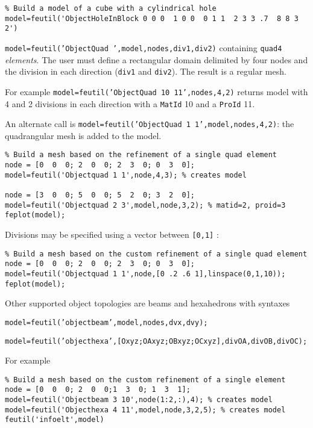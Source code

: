 \begin{verbatim}
% Build a model of a cube with a cylindrical hole
model=feutil('ObjectHoleInBlock 0 0 0  1 0 0  0 1 1  2 3 3 .7  8 8 3 2') 
\end{verbatim}%



{\tt model=feutil('ObjectQuad ',model,nodes,div1,div2)}
 containing {\tt quad4} {\sl elements}. The user must define a rectangular domain delimited by four nodes and the division in each direction ({\tt div1} and {\tt div2}). The result is a regular mesh. 

For example {\tt model=feutil('ObjectQuad 10 11',nodes,4,2)} returns model with 4 and 2 divisions in each direction with a {\tt MatId} 10 and a {\tt ProId} 11.

An alternate call is {\tt model=feutil('ObjectQuad 1 1',model,nodes,4,2)}: the quadrangular mesh is added to the model.

\begin{verbatim}
% Build a mesh based on the refinement of a single quad element
node = [0  0  0; 2  0  0; 2  3  0; 0  3  0];
model=feutil('Objectquad 1 1',node,4,3); % creates model 

node = [3  0  0; 5  0  0; 5  2  0; 3  2  0];
model=feutil('Objectquad 2 3',model,node,3,2); % matid=2, proid=3
feplot(model);
\end{verbatim}%


Divisions may be specified using a vector between {\tt [0,1]} :
\begin{verbatim}
% Build a mesh based on the custom refinement of a single quad element
node = [0  0  0; 2  0  0; 2  3  0; 0  3  0];
model=feutil('Objectquad 1 1',node,[0 .2 .6 1],linspace(0,1,10)); 
feplot(model);
\end{verbatim}%


Other supported object topologies are beams and hexahedrons with syntaxes

{\tt model=feutil('objectbeam',model,nodes,dvx,dvy);}

{\tt model=feutil('objecthexa',[Oxyz;OAxyz;OBxyz;OCxyz],divOA,divOB,divOC);}

For example
\begin{verbatim}
% Build a mesh based on the custom refinement of a single element
node = [0  0  0; 2  0  0;1  3  0; 1  3  1];
model=feutil('Objectbeam 3 10',node(1:2,:),4); % creates model 
model=feutil('Objecthexa 4 11',model,node,3,2,5); % creates model 
feutil('infoelt',model)
\end{verbatim}%


